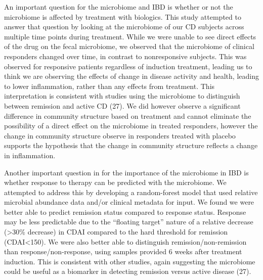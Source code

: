 \documentclass[11pt,]{article}
\begin{document}
An important question for the microbiome and IBD is whether or not the
microbiome is affected by treatment with biologics. This study attempted
to answer that question by looking at the microbiome of our CD subjects
across multiple time points during treatment. While we were unable to
see direct effects of the drug on the fecal microbiome, we observed that
the microbiome of clinical responders changed over time, in contrast to
nonresponsive subjects. This was observed for responsive patients
regardless of induction treatment, leading us to think we are observing
the effects of change in disease activity and health, leading to lower
inflammation, rather than any effects from treatment. This
interpretation is consistent with studies using the microbiome to
distinguish between remission and active CD (27). We did however observe
a significant difference in community structure based on treatment and
cannot eliminate the possibility of a direct effect on the microbiome in
treated responders, however the change in community structure observe in
responders treated with placebo supports the hypothesis that the change
in community structure reflects a change in inflammation.

Another important question in for the importance of the microbiome in
IBD is whether response to therapy can be predicted with the microbiome.
We attempted to address this by developing a random-forest model that
used relative microbial abundance data and/or clinical metadata for
input. We found we were better able to predict remission status compared
to response status. Response may be less predictable due to the
``floating target'' nature of a relative decrease (\textgreater{}30\%
decrease) in CDAI compared to the hard threshold for remission
(CDAI\textless{}150). We were also better able to distinguish
remission/non-remission than response/non-response, using samples
provided 6 weeks after treatment induction. This is consistent with
other studies, again suggesting the microbiome could be useful as a
biomarker in detecting remission versus active disease (27).
\end{document}

